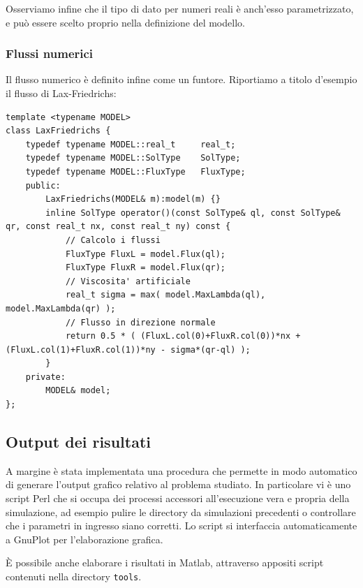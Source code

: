 Osserviamo infine che il tipo di dato per numeri reali è anch'esso parametrizzato, e può essere scelto proprio nella definizione del modello.

\subsubsection{Flussi numerici}
Il flusso numerico è definito infine come un funtore. Riportiamo a titolo d'esempio il flusso di Lax-Friedrichs:
\begin{lstlisting}
template <typename MODEL>
class LaxFriedrichs {
	typedef typename MODEL::real_t     real_t;
	typedef typename MODEL::SolType    SolType;
	typedef typename MODEL::FluxType   FluxType;
	public:
		LaxFriedrichs(MODEL& m):model(m) {}
		inline SolType operator()(const SolType& ql, const SolType& qr, const real_t nx, const real_t ny) const { 
			// Calcolo i flussi
			FluxType FluxL = model.Flux(ql);
			FluxType FluxR = model.Flux(qr);
			// Viscosita' artificiale
			real_t sigma = max( model.MaxLambda(ql), model.MaxLambda(qr) );
			// Flusso in direzione normale
			return 0.5 * ( (FluxL.col(0)+FluxR.col(0))*nx + (FluxL.col(1)+FluxR.col(1))*ny - sigma*(qr-ql) );
		}
	private:
		MODEL& model;
};
\end{lstlisting}
\subsection{Output dei risultati}
A margine è stata implementata una procedura che permette in modo automatico di generare l'output grafico relativo al problema studiato. In particolare vi è uno script Perl che si occupa dei processi accessori all'esecuzione vera e propria della simulazione, ad esempio pulire le directory da simulazioni precedenti o controllare che i parametri in ingresso siano corretti. Lo script si interfaccia automaticamente a GnuPlot per l'elaborazione grafica.

È possibile anche elaborare i risultati in Matlab, attraverso appositi script contenuti nella directory \texttt{tools}.

